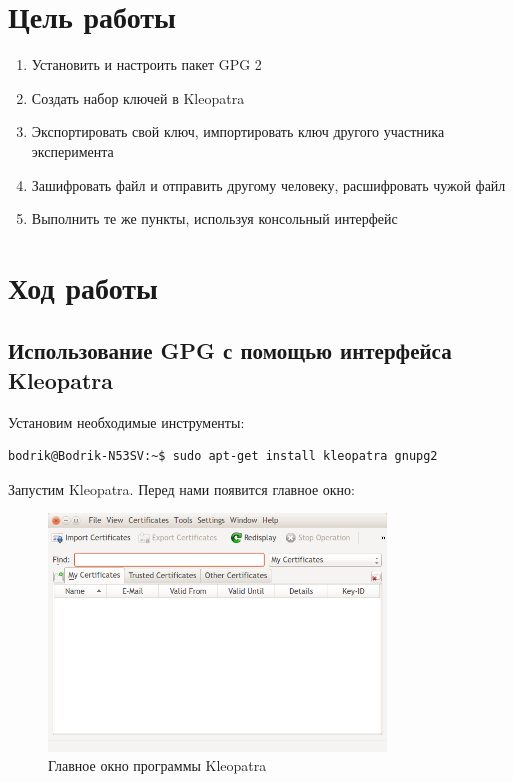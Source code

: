 \section{Цель работы}

\begin{enumerate}
	\item Установить и настроить пакет GPG 2
	\item Создать набор ключей в Kleopatra
	\item Экспортировать свой ключ, импортировать ключ другого участника эксперимента
	\item Зашифровать файл и отправить другому человеку, расшифровать чужой файл
	\item Выполнить те же пункты, используя консольный интерфейс
\end{enumerate}

\section{Ход работы}

\subsection{Использование GPG с помощью интерфейса Kleopatra}

Установим необходимые инструменты:

\begin{verbatim}
bodrik@Bodrik-N53SV:~$ sudo apt-get install kleopatra gnupg2
\end{verbatim}

Запустим Kleopatra. Перед нами появится главное окно:

\begin{figure}[H]
	\centering
	\includegraphics[width=0.8\textwidth]{images/1.png}
	\caption{Главное окно программы Kleopatra}
\end{figure}

